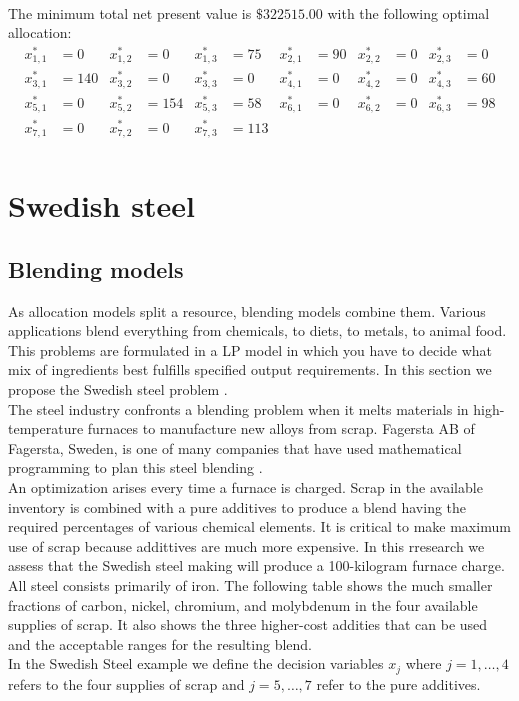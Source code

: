 \documentclass[a4paper,10 pt,titlepage,twoside]{book}
\theoremstyle{plain}
\theoremstyle{definition}
\theoremstyle{remark}
\begin{document}
\\
The minimum total net present value is $\$322515.00$ with the following optimal allocation:
\begin{align*}
x_{1,1}^{*} &=  0 & x_{1,2}^{*}&= 0 & x_{1,3}^{*} &= 75 & x_{2,1}^{*} &= 90 & x_{2,2}^{*} &= 0 & x_{2,3}^{*} &= 0\\
x_{3,1}^{*} &= 140 & x_{3,2}^{*}&= 0 & x_{3,3}^{*} &= 0 & x_{4,1}^{*} &= 0 & x_{4,2}^{*} &= 0 & x_{4,3}^{*} &= 60\\
x_{5,1}^{*} &= 0 & x_{5,2}^{*}&= 154 & x_{5,3}^{*} &= 58 & x_{6,1}^{*} &= 0 & x_{6,2}^{*} &= 0 & x_{6,3}^{*} &= 98\\
 x_{7,1}^{*}&=0 &x_{7,2}^{*} &= 0 & x_{7,3}^{*} &= 113 & & & &  & & \\
\end{align*}
\section{Swedish steel}
\subsection*{Blending models}
As allocation models split a resource, blending models combine them. Various applications blend everything from chemicals, to diets, to metals, to animal food. This problems are formulated in a LP model in which you have to decide what mix of ingredients best fulfills specified output requirements. In this section we propose the Swedish steel problem \cite{SP}.\\
The steel industry confronts a blending problem when it melts materials in high-temperature furnaces to manufacture new alloys from scrap. Fagersta AB of Fagersta, Sweden, is one of many companies that have used mathematical programming to plan this steel blending \cite{SSM}.\\
An optimization arises every time a furnace is charged. Scrap in the available inventory is combined with a pure additives to produce a blend having the required percentages of various chemical elements. It is critical to make maximum use of scrap because addittives are much more expensive. In this rresearch we assess that the Swedish steel making will produce a 100-kilogram furnace charge. All steel consists primarily of iron. The following table shows the much smaller fractions of carbon, nickel, chromium, and molybdenum in the four available supplies of scrap. It also shows the three higher-cost addities that can be used and the acceptable ranges for the resulting blend.\\ In the Swedish Steel example we define the decision variables $x_{j}$ where $j = 1, \dots, 4$ refers to the four supplies of scrap and $j = 5, \dots, 7$ refer to the pure additives.\\
\end{document}

